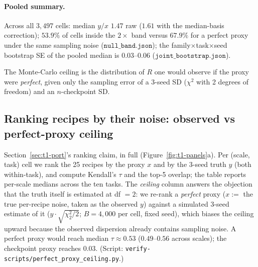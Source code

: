 \paragraph{Pooled summary.} Across all $3{,}497$ cells: median $y/x$ $1.47$ raw ($1.61$ with the
median-basis correction); $53.9\%$ of cells inside the $2\times$ band versus $67.9\%$ for a
perfect proxy under the same sampling noise ($\texttt{null\_band.json}$); the
family$\times$task$\times$seed bootstrap SE of the pooled median is $0.03$--$0.06$
($\texttt{joint\_bootstrap.json}$).

The Monte-Carlo ceiling is the distribution of $R$ one would observe if the proxy were
\emph{perfect}, given only the sampling error of a 3-seed SD ($\chi^2$ with 2 degrees of
freedom) and an $n$-checkpoint SD.

\subsection{Ranking recipes by their noise: observed vs perfect-proxy ceiling}
\label{app:t1-ranking}

Section~\ref{sec:t1-port}'s ranking claim, in full (Figure~\ref{fig:t1-panels}a). Per (scale, task) cell we rank the 25
recipes by the proxy $x$ and by the 3-seed truth $y$ (both within-task), and compute Kendall's
$\tau$ and the top-5 overlap; the table reports per-scale medians across the ten tasks. The
\emph{ceiling} column answers the objection that the truth itself is estimated at df $= 2$:
we re-rank a \emph{perfect} proxy ($x :=$ the true per-recipe noise, taken as the observed
$y$) against a simulated 3-seed estimate of it ($y \cdot \sqrt{\chi^2_2/2}$; $B = 4{,}000$
per cell, fixed seed), which biases the ceiling upward because the observed dispersion already
contains sampling noise. A perfect proxy would reach median $\tau \approx 0.53$
($0.49$--$0.56$ across scales); the checkpoint
proxy reaches $0.03$. (Script: \texttt{verify-scripts/perfect\_proxy\_ceiling.py}.)

